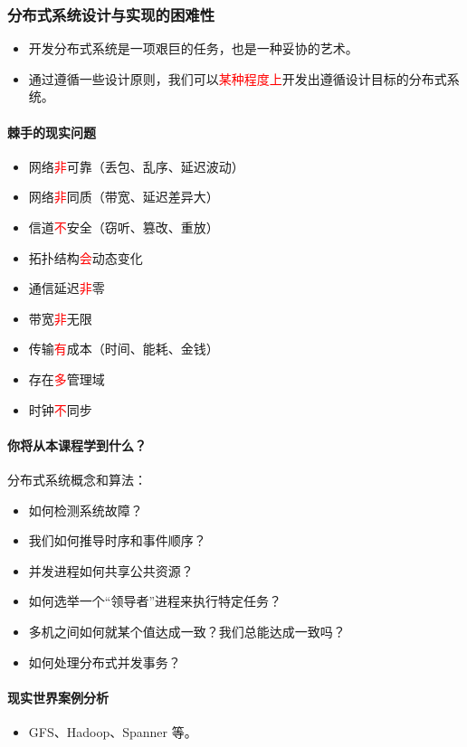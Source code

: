 \documentclass[UTF8,a4paper,11pt]{ctexart}
\newcommand{\red}[1]{\textcolor{red}{#1}}
\begin{document}
\subsubsection*{分布式系统设计与实现的困难性}

\begin{itemize}
  \item 开发分布式系统是一项艰巨的任务，也是一种妥协的艺术。
  \item 通过遵循一些设计原则，我们可以\red{某种程度上}开发出遵循设计目标的分布式系统。
\end{itemize}

\paragraph{棘手的现实问题}
\begin{itemize}
  \item 网络\red{非}可靠（丢包、乱序、延迟波动）
  \item 网络\red{非}同质（带宽、延迟差异大）
  \item 信道\red{不}安全（窃听、篡改、重放）
  \item 拓扑结构\red{会}动态变化
  \item 通信延迟\red{非}零
  \item 带宽\red{非}无限
  \item 传输\red{有}成本（时间、能耗、金钱）
  \item 存在\red{多}管理域
  \item 时钟\red{不}同步
\end{itemize}

\paragraph{你将从本课程学到什么？}
分布式系统概念和算法：
\begin{itemize}
  \item 如何检测系统故障？
  \item 我们如何推导时序和事件顺序？
  \item 并发进程如何共享公共资源？
  \item 如何选举一个“领导者”进程来执行特定任务？
  \item 多机之间如何就某个值达成一致？我们总能达成一致吗？
  \item 如何处理分布式并发事务？
\end{itemize}

\paragraph{现实世界案例分析}
\begin{itemize}
  \item GFS、Hadoop、Spanner 等。
\end{itemize}
\end{document}
